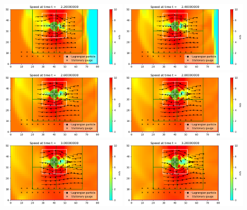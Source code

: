 \documentclass[11pt]{article}
\begin{document}
\vskip 10pt 
\includegraphics[width=0.475\textwidth]{frame0011fig0.png}
\vskip 10pt 
\includegraphics[width=0.475\textwidth]{frame0012fig0.png}
\vskip 10pt 
\includegraphics[width=0.475\textwidth]{frame0013fig0.png}
\vskip 10pt 
\includegraphics[width=0.475\textwidth]{frame0014fig0.png}
\vskip 10pt 
\includegraphics[width=0.475\textwidth]{frame0015fig0.png}
\vskip 10pt 
\includegraphics[width=0.475\textwidth]{frame0016fig0.png}
\end{document}
